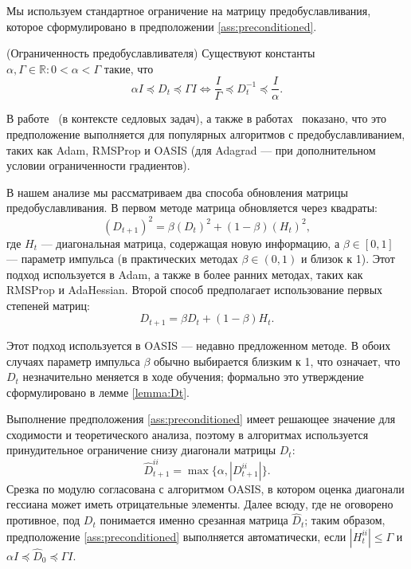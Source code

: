 Мы используем стандартное ограничение на матрицу предобуславливания, которое сформулировано в предположении \ref{ass:preconditioned}.

\begin{assumption}{(Ограниченность предобуславливателя)}
\label{ass:preconditioned}
Существуют константы $\alpha, \Gamma \in \mathbb{R} : 0 < \alpha < \Gamma$ такие, что
\begin{equation*}
\alpha I \preccurlyeq D_t \preccurlyeq \Gamma I \Leftrightarrow \frac{I}{\Gamma} \preccurlyeq D_t^{-1} \preccurlyeq \frac{I}{\alpha}.
\end{equation*}
\end{assumption}

В работе~\citep{beznosikov2022scaled} (в контексте седловых задач), а также в работах~\citep{jahani2021doubly, sadiev2022stochastic} показано, что это предположение выполняется для популярных алгоритмов с предобуславливанием, таких как Adam, RMSProp и OASIS (для Adagrad --- при дополнительном условии ограниченности градиентов).


В нашем анализе мы рассматриваем два способа обновления матрицы предобуславливания.
В первом методе матрица обновляется через квадраты:
\begin{equation}
\label{eq:squares}
    (D_{t+1})^2 = \beta (D_t)^2 + (1 - \beta) (H_t)^2,
\end{equation}
где $H_t$ --- диагональная матрица, содержащая новую информацию, а $\beta \in [0, 1]$ --- параметр импульса (в практических методах $\beta \in (0, 1)$ и близок к 1).
Этот подход используется в Adam, а также в более ранних методах, таких как RMSProp и AdaHessian.
Второй способ предполагает использование первых степеней матриц:
\begin{equation}
\label{eq:linear}
    D_{t+1} = \beta D_t + (1 - \beta) H_t.
\end{equation}

Этот подход используется в OASIS --- недавно предложенном методе. В обоих случаях параметр импульса $\beta$ обычно выбирается близким к 1, что означает, что $D_t$ незначительно меняется в ходе обучения; формально это утверждение сформулировано в лемме \ref{lemma:Dt}.

Выполнение предположения \ref{ass:preconditioned} имеет решающее значение для сходимости и теоретического анализа, поэтому в алгоритмах используется принудительное ограничение снизу диагонали матрицы $D_t$:
\begin{equation}
\label{eq:alpha}
    \hat{D}_{t+1}^{ii} = \max \{ \alpha, |D_{t+1}^{ii}| \}.
\end{equation}
Срезка по модулю согласована с алгоритмом OASIS, в котором оценка диагонали гессиана может иметь отрицательные элементы. Далее всюду, где не оговорено противное, под $D_t$ понимается именно срезанная матрица $\hat{D}_t$; таким образом, предположение \ref{ass:preconditioned} выполняется автоматически, если $|H_t^{ii}| \le \Gamma$ и $\alpha I \preccurlyeq \hat{D}_0 \preccurlyeq \Gamma I$.


